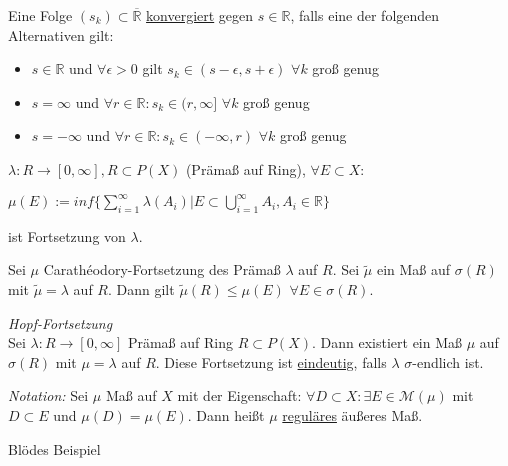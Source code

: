 \documentclass[11pt]{memoir}
\newcommand{\cara}{Carathéodory-Fortsetzung}
\begin{document}
\begin{Definition}
Eine Folge $(s_{k}) \subset \overline{\mathbb{R}}$ \underline{konvergiert} gegen $s \in \mathbb{R}$, falls eine der folgenden Alternativen gilt:
\begin{itemize}
	\item  $s \in \mathbb{R}$ und $\forall \epsilon > 0$ gilt $s_{k} \in (s-\epsilon, s+\epsilon)$ $\forall k$ groß genug
	\item $s = \infty$ und $\forall r \in \mathbb{R}: s_{k} \in (r, \infty]$ $\forall k$ groß genug
	\item $s = -\infty$ und $\forall r \in \mathbb{R}: s_k \in (-\infty, r)$ $\forall k$ groß genug
\end{itemize}

\end{Definition}



\begin{Satz}
$\lambda: R \rightarrow [0, \infty], {}R \subset P(X)$ (Prämaß auf Ring), $\forall {}E \subset X:$ \\
\begin{center}
$\mu(E):= inf\{ \sum\limits_{i=1}^{\infty} \lambda(A_i) | E \subset \bigcup\limits_{i=1}^{\infty} A_i, A_i \in \mathbb{R}\}$
\end{center}
ist Fortsetzung von $\lambda$.
\end{Satz}

\begin{Lemma}
Sei $\mu$ \cara{} des Prämaß $\lambda$ auf $R$. Sei $\tilde{\mu}$ ein Maß auf $\sigma(R)$ mit $\tilde{\mu} = \lambda$ auf $R$. Dann gilt $\tilde{\mu}(R) \leq \mu(E)$ $\forall E \in \sigma(R)$.
\end{Lemma}


\begin{Satz} \emph{Hopf-Fortsetzung} \\
Sei $\lambda: R \rightarrow [0, \infty]$ Prämaß auf Ring $R \subset P(X)$. Dann existiert ein Maß $\mu$ auf $\sigma(R)$ mit $\mu =\lambda$ auf $R$. Diese Fortsetzung ist \underline{eindeutig}, falls $\lambda$ $\sigma$-endlich ist.
\end{Satz}

\emph{Notation:}
Sei $\mu$ Maß auf $X$ mit der Eigenschaft: $\forall D \subset X: \exists E \in \mathscr{M}(\mu)$ mit $D \subset E$ und $\mu(D) = \mu(E)$. Dann heißt $\mu$ \underline{reguläres} äußeres Maß.

\begin{Beispiel}

Blödes Beispiel
\end{Beispiel}
\end{document}
